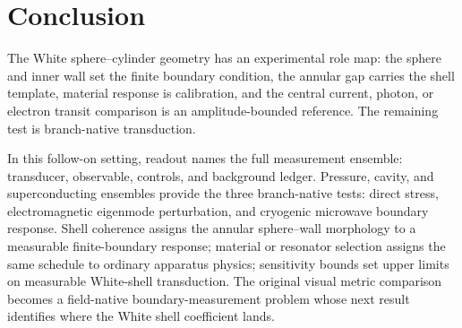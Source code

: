 \documentclass[11pt]{article}
\begin{document}
\section{Conclusion}

The White sphere--cylinder geometry has an experimental role map: the sphere
and inner wall set the finite boundary condition, the annular gap carries the
shell template, material response is calibration, and the central
current, photon, or electron transit comparison is an amplitude-bounded reference.
The remaining test is branch-native transduction.

In this follow-on setting, readout names the full measurement ensemble:
transducer, observable, controls, and background ledger. Pressure, cavity, and
superconducting ensembles provide the three branch-native tests: direct
stress, electromagnetic eigenmode perturbation, and cryogenic microwave
boundary response. Shell coherence assigns the annular sphere--wall morphology
to a measurable finite-boundary response; material or resonator selection
assigns the same schedule to ordinary apparatus physics; sensitivity bounds
set upper limits on measurable White-shell transduction. The original visual
metric comparison becomes a field-native boundary-measurement problem whose
next result identifies where the White shell coefficient lands.
\end{document}
